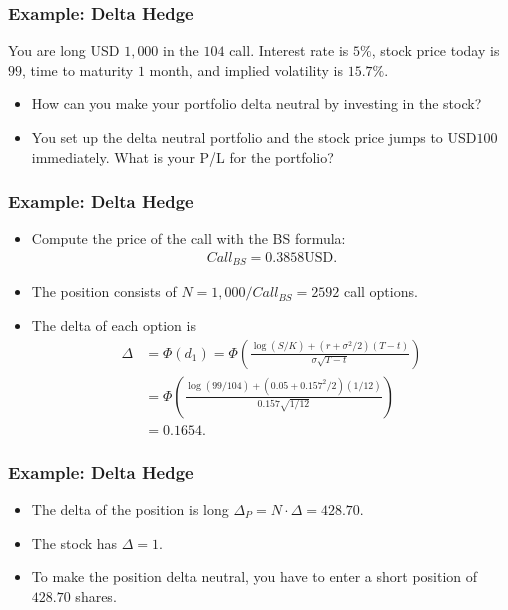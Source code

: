 \begin{frame}[fragile]
\frametitle{Example: Delta Hedge}
You are long USD $1,000$ in the $104$ call. Interest rate is $5\%$,
stock price today is $99$, time to maturity $1$ month, and implied volatility is
$15.7\%$. 
\begin{itemize}
  \item How can you make your portfolio delta neutral by investing in the stock?
  \item You set up the delta neutral portfolio and the stock price jumps to
  USD$100$ immediately. What is your P/L for the portfolio?
\end{itemize}

\end{frame}

\begin{frame}[fragile]
\frametitle{Example: Delta Hedge}
\begin{itemize}
  \item Compute the price of the call with the BS formula:
  \begin{align*}
    Call_{BS} = 0.3858 \text{USD}.
  \end{align*}
  \item The position consists of $N=1,000/Call_{BS}=2592$ call options.
  \item The delta of each option is 
  \begin{align*}
    \Delta &= \Phi(d_1) =\Phi\left(\frac{\log \left( S/K \right) + (r+\sigma^2/2)(T-t)
    }{\sigma\sqrt{T-t}}\right) \\
    	&= \Phi\left(\frac{\log \left( 99/104 \right) + (0.05+0.157^2/2)(1/12)
    }{0.157\sqrt{1/12}}\right)\\
     	&= 0.1654.
  \end{align*}
\end{itemize}
\end{frame}


\begin{frame}[fragile]
\frametitle{Example: Delta Hedge}
\begin{itemize}
  \item The delta of the position is long $\Delta_P=N\cdot \Delta=428.70$.
  \item The stock has $\Delta=1$.
  \item To make the position delta neutral, you have to enter a short position
  of $428.70$ shares.
\end{itemize}
\end{frame}

